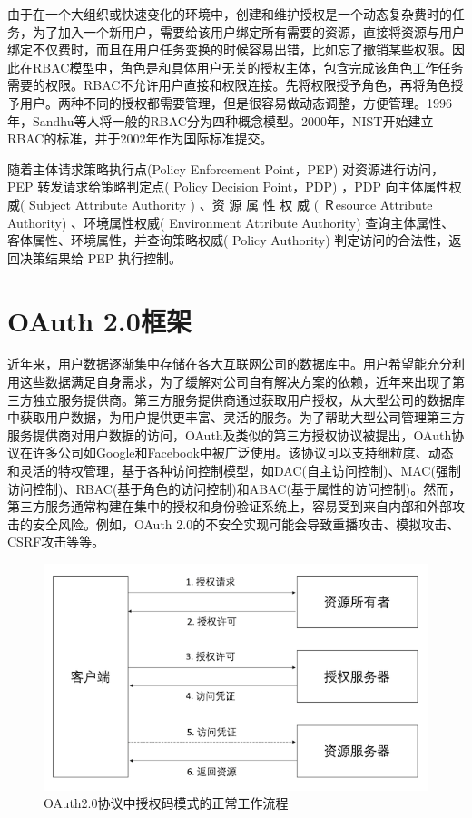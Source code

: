 由于在一个大组织或快速变化的环境中，创建和维护授权是一个动态复杂费时的任务，为了加入一个新用户，需要给该用户绑定所有需要的资源，直接将资源与用户绑定不仅费时，而且在用户任务变换的时候容易出错，比如忘了撤销某些权限。因此在RBAC模型中，角色是和具体用户无关的授权主体，包含完成该角色工作任务需要的权限。RBAC不允许用户直接和权限连接。先将权限授予角色，再将角色授予用户。两种不同的授权都需要管理，但是很容易做动态调整，方便管理。1996年，Sandhu等人将一般的RBAC分为四种概念模型。2000年，NIST开始建立RBAC的标准，并于2002年作为国际标准提交。

随着主体请求策略执行点(Policy Enforcement Point，PEP) 对资源进行访问，PEP 转发请求给策略判定点( Policy Decision Point，PDP) ，PDP 向主体属性权威( Subject Attribute Authority ) 、资 源 属 性 权 威 ( Ｒesource Attribute Authority) 、环境属性权威( Environment Attribute Authority) 查询主体属性、客体属性、环境属性，并查询策略权威( Policy Authority) 判定访问的合法性，返回决策结果给 PEP 执行控制。


\section{OAuth 2.0框架}

近年来，用户数据逐渐集中存储在各大互联网公司的数据库中。用户希望能充分利用这些数据满足自身需求，为了缓解对公司自有解决方案的依赖，近年来出现了第三方独立服务提供商。第三方服务提供商通过获取用户授权，从大型公司的数据库中获取用户数据，为用户提供更丰富、灵活的服务。为了帮助大型公司管理第三方服务提供商对用户数据的访问，OAuth及类似的第三方授权协议被提出，OAuth协议在许多公司如Google和Facebook中被广泛使用。该协议可以支持细粒度、动态和灵活的特权管理，基于各种访问控制模型，如DAC(自主访问控制)、MAC(强制访问控制)、RBAC(基于角色的访问控制)和ABAC(基于属性的访问控制)。然而，第三方服务通常构建在集中的授权和身份验证系统上，容易受到来自内部和外部攻击的安全风险。例如，OAuth 2.0的不安全实现可能会导致重播攻击、模拟攻击、CSRF攻击等等。

\begin{figure}
\centering  
\includegraphics [width=400pt]{figures/oauth.png}
\caption{OAuth2.0协议中授权码模式的正常工作流程}
\label{fig:oauth}
\end{figure}

